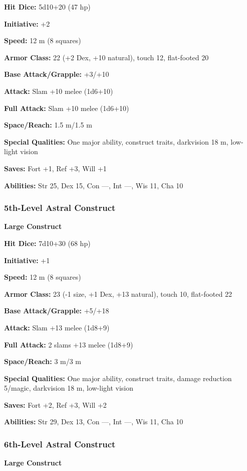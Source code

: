{\begin{MonsterMiniStats}
	\textbf{Hit Dice:} 5d10+20 (47 hp)

	\textbf{Initiative:} +2

	\textbf{Speed:} 12 m (8 squares)

	\textbf{Armor Class:} 22 (+2 Dex, +10 natural), touch 12, flat-footed 20

	\textbf{Base Attack/Grapple:} +3/+10

	\textbf{Attack:} Slam +10 melee (1d6+10)

	\textbf{Full Attack:} Slam +10 melee (1d6+10)

	\textbf{Space/Reach:} 1.5 m/1.5 m

	\textbf{Special Qualities:} One major ability, construct traits, darkvision 18 m, low-light vision

	\textbf{Saves:} Fort +1, Ref +3, Will +1

	\textbf{Abilities:} Str 25, Dex 15, Con ---, Int ---, Wis 11, Cha 10
	\end{MonsterMiniStats}

\subsubsection{5th-Level Astral Construct}
	\begin{MonsterMiniStats}
	\textbf{Large Construct}

	\textbf{Hit Dice:} 7d10+30 (68 hp)

	\textbf{Initiative:} +1

	\textbf{Speed:} 12 m (8 squares)

	\textbf{Armor Class:} 23 (-1 size, +1 Dex, +13 natural), touch 10, flat-footed 22

	\textbf{Base Attack/Grapple:} +5/+18

	\textbf{Attack:} Slam +13 melee (1d8+9)

	\textbf{Full Attack:} 2 slams +13 melee (1d8+9)

	\textbf{Space/Reach:} 3 m/3 m

	\textbf{Special Qualities:} One major ability, construct traits, damage reduction 5/magic, darkvision 18 m, low-light vision

	\textbf{Saves:} Fort +2, Ref +3, Will +2

	\textbf{Abilities:} Str 29, Dex 13, Con ---, Int ---, Wis 11, Cha 10
	\end{MonsterMiniStats}

\subsubsection{6th-Level Astral Construct}
	\begin{MonsterMiniStats}
	\textbf{Large Construct}


\end{MonsterMiniStats}}
